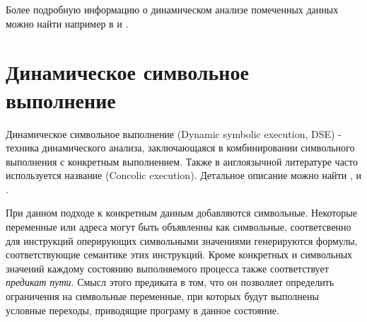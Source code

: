 Более подробную информацию о динамическом анализе помеченных данных можно найти например в \cite{Schwartz} и \cite{PBA}.






\section{Динамическое символьное выполнение}

Динамическое символьное выполнение (Dynamic symbolic execution, DSE) - техника динамического анализа, заключающаяся в комбинировании символьного выполнения с конкретным выполнением. Также в англоязычной литературе часто используется название (Concolic execution). Детальное описание можно найти \cite{Schwartz}, \cite{PBA} и \cite{SurveySymExec}.

При данном подходе к конкретным данным добавляются символьные. Некоторые переменные или адреса могут быть объявленны как символьные, соответсвенно для инструкций оперирующих символьными значениями генерируются формулы, соответствующие семантике этих инструкций. Кроме конкретных и символьных значений каждому состоянию выполняемого процесса также соответствует \emph{предикат пути}. Смысл этого предиката в том, что он позволяет определить ограничения на символьные переменные, при которых будут выполнены условные переходы, приводящие програму в данное состояние.

